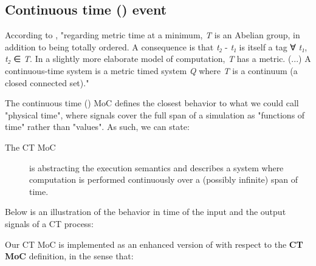 \subsection{Continuous time () event}
According to \cite{Lee98}, "{}regarding
 metric time{} at a minimum, \emph{T} is an Abelian group, in addition
 to being totally ordered. A consequence is that \emph{t₂} -
 \emph{t₁} is itself a tag ∀ \emph{t₁}, \emph{t₂} ∈
 \emph{T}. In a slightly more elaborate model of computation, \emph{T} has a
 metric. (...) A continuous-time system is a metric timed system
 \emph{Q} where \emph{T} is a continuum (a closed connected set)."\par
The continuous time () MoC defines the closest behavior to
 what we could call "physical time", where signals cover the full
 span of a simulation as "functions of time" rather than
 "values". As such, we can state:\par
\begin{description}
\item[The CT MoC] is abstracting the execution semantics and describes
 a system where computation is performed continuously over a
 (possibly infinite) span of time.
\end{description}Below is an illustration of the behavior in time of the input and
 the output signals of a CT process:\par
                 \par
                 Our CT MoC is implemented as an enhanced version of
  with respect to the \textbf{CT MoC} definition, in
 the sense that:\par
